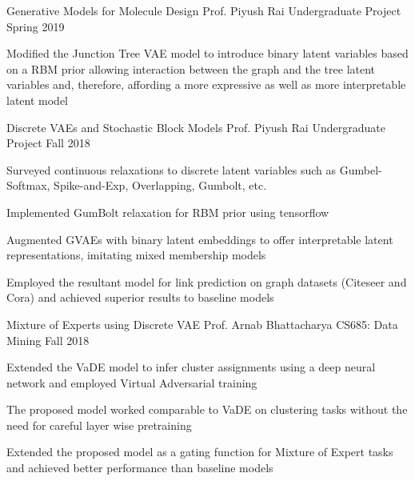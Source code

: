 

\cventry
	{Generative Models for Molecule Design}
	{Prof. Piyush Rai}
	{Undergraduate Project}
	{Spring 2019}
	{
		\begin{cvitems}
			\item Modified the Junction Tree VAE model to introduce binary latent variables based on a RBM prior allowing interaction between the graph and the tree latent variables and, therefore, affording a more expressive as well as more interpretable latent model
		\end{cvitems}
	}

\cventry
	{Discrete VAEs and Stochastic Block Models}
	{Prof. Piyush Rai}
	{Undergraduate Project}
	{Fall 2018}
	{
		\begin{cvitems}
			\item Surveyed continuous relaxations to discrete latent variables such as Gumbel-Softmax, Spike-and-Exp, Overlapping, Gumbolt, etc.
			\item Implemented GumBolt relaxation for RBM prior using tensorflow
			\item Augmented GVAEs with binary latent embeddings to offer interpretable latent representations, imitating mixed membership models
			\item Employed the resultant model for link prediction on graph datasets (Citeseer and Cora) and achieved superior results to baseline models
		\end{cvitems}
	}

\cventry
	{Mixture of Experts using Discrete VAE}
	{Prof. Arnab Bhattacharya}
	{CS685: Data Mining}
	{Fall 2018}
	{
		\begin{cvitems}
			\item Extended the VaDE model to infer cluster assignments using a deep neural network and employed Virtual Adversarial training
			\item The proposed model worked comparable to VaDE on clustering tasks without the need for careful layer wise pretraining
			\item Extended the proposed model as a gating function for Mixture of Expert tasks and achieved better performance than baseline models
		\end{cvitems}
	}

